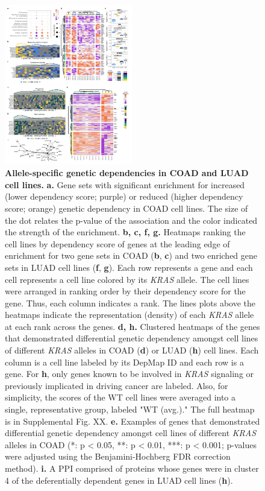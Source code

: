 \documentclass[english, 12pt, letterpaper]{article}
\newcommand{\KRAS}{\emph{KRAS}}
\begin{document}
\begin{figure}
\centering
\includegraphics[height=70mm]{figures/Figure_04.jpeg}
\caption{
    \textbf{Allele-specific genetic dependencies in COAD and LUAD cell lines.}
    \textbf{a.} Gene sets with significant enrichment for increased (lower dependency score; purple) or reduced (higher dependency score; orange) genetic dependency in COAD cell lines. The size of the dot relates the p-value of the association and the color indicated the strength of the enrichment.
    \textbf{b, c, f, g.} Heatmaps ranking the cell lines by dependency score of genes at the leading edge of enrichment for two gene sets in COAD (\textbf{b}, \textbf{c}) and two enriched gene sets in LUAD cell lines (\textbf{f}, \textbf{g}). Each row represents a gene and each cell represents a cell line colored by its \KRAS{} allele. The cell lines were arranged in ranking order by their dependency score for the gene. Thus, each column indicates a rank. The lines plots above the heatmaps indicate the representation (density) of each \KRAS{} allele at each rank across the genes.
    \textbf{d, h.} Clustered heatmaps of the genes that demonstrated differential genetic dependency amongst cell lines of different \KRAS{} alleles in COAD (\textbf{d}) or LUAD (\textbf{h}) cell lines. Each column is a cell line labeled by its DepMap ID and each row is a gene. For \textbf{h}, only genes known to be involved in \KRAS{} signaling or previously implicated in driving cancer are labeled. Also, for simplicity, the scores of the WT cell lines were averaged into a single, representative group, labeled "WT (avg.)." The full heatmap is in Supplemental Fig. XX.
    \textbf{e.} Examples of genes that demonstrated differential genetic dependency amongst cell lines of different \KRAS{} alleles in COAD (*: p < 0.05, **: p < 0.01, ***: p < 0.001; p-values were adjusted using the Benjamini-Hochberg FDR correction method).
    \textbf{i.} A PPI comprised of proteins whose genes were in cluster 4 of the deferentially dependent genes in LUAD cell lines (\textbf{h}).
}
\label{fig:coadluad-dependency-main}
\end{figure}
\end{document}
